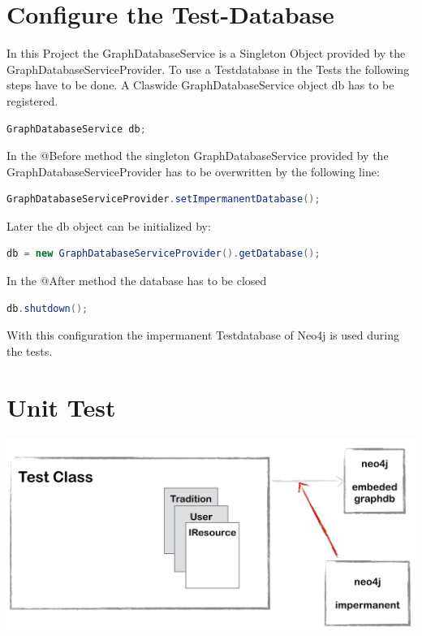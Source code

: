 \documentclass[11pt,fleqn,openany]{book} %
\begin{document}

\chapter{Configure the Test-Database}

In this Project the GraphDatabaseService is a Singleton Object provided by the GraphDatabaseServiceProvider. To use a Testdatabase in the Tests the following steps have to be done.
A Claswide GraphDatabaseService object db has to be registered.

\begin{lstlisting}[language=java]
    GraphDatabaseService db;
\end{lstlisting}
In the @Before method the singleton GraphDatabaseService provided by the GraphDatabaseServiceProvider has to be overwritten by the following line:

\begin{lstlisting}[language=java]
    GraphDatabaseServiceProvider.setImpermanentDatabase();
\end{lstlisting}
Later the db object can be initialized by:
\begin{lstlisting}[language=java]
    db = new GraphDatabaseServiceProvider().getDatabase();
\end{lstlisting}
In the @After method the database has to be closed
\begin{lstlisting}[language=java]
    db.shutdown();
\end{lstlisting}
With this configuration the impermanent Testdatabase of Neo4j is used during the tests. 


\chapter{Unit Test}

\begin{center}
\includegraphics[scale=.4]{Pictures/junitoverview.png}
\end{center} 
 
\end{document}
